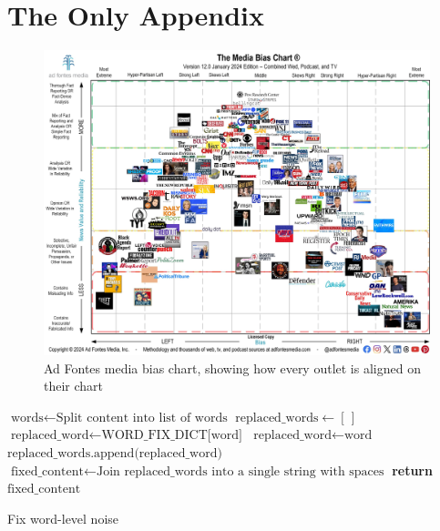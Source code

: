 \chapter{The Only Appendix}
\label{app:A}


\begin{figure}[htbp]
    \centering
    \includegraphics[width=1\linewidth]{images/Media-Bias-Chart-12.0_Jan-2024-Licensed-scaled.jpg}
    \caption{Ad Fontes media bias chart, showing how every outlet is aligned on their chart}
    \label{fig:adfontes-media-bias-chart}
\end{figure}


\begin{algorithm}
    \begin{algorithmic}[1]
        \State $\text{words} \gets \text{Split content into list of words}$ 
        \State $\text{replaced\_words} \gets [\,]$
        \State $\text{replaced\_word} \gets \text{WORD\_FIX\_DICT[word]}$ 
        \State $\text{replaced\_word} \gets \text{word}$ 
        \EndIf
        \State $\text{replaced\_words.append(replaced\_word)}$
        \EndFor
        \State $\text{fixed\_content} \gets \text{Join replaced\_words into a single string with spaces}$
        \State \textbf{return} $\text{fixed\_content}$
        \EndProcedure
    \end{algorithmic}
    \caption{Fix word-level noise}
    \label{alg:word_level_noise_fix}
\end{algorithm}

